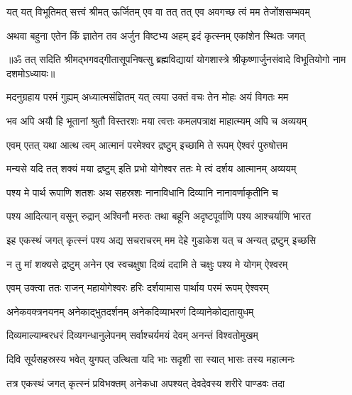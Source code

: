 \twolineshloka
{यत् यत् विभूतिमत् सत्त्वं श्रीमत् ऊर्जितम् एव वा}
{तत् तत् एव अवगच्छ त्वं मम तेजोंशसम्भवम्}%

\twolineshloka
{अथवा बहुना एतेन किं ज्ञातेन तव अर्जुन}
{विष्टभ्य अहम् इदं कृत्स्नम् एकांशेन स्थितः जगत्}%

{॥ॐ तत् सदिति श्रीमद्भगवद्गीतासूपनिषत्सु ब्रह्मविद्यायां योगशास्त्रे श्रीकृष्णार्जुनसंवादे विभूतियोगो नाम दशमोऽध्यायः॥}



\twolineshloka
{मदनुग्रहाय परमं गुह्यम् अध्यात्मसंज्ञितम्}
{यत् त्वया उक्तं वचः तेन मोहः अयं विगतः मम}%

\twolineshloka
{भव अपि अयौ हि भूतानां श्रुतौ विस्तरशः मया}
{त्वत्तः कमलपत्राक्ष माहात्म्यम् अपि च अव्ययम्}%

\twolineshloka
{एवम् एतत् यथा आत्थ त्वम् आत्मानं परमेश्वर}
{द्रष्टुम् इच्छामि ते रूपम् ऐश्वरं पुरुषोत्तम}%

\twolineshloka
{मन्यसे यदि तत् शक्यं मया द्रष्टुम् इति प्रभो}
{योगेश्वर ततः मे त्वं दर्शय आत्मानम् अव्ययम्}%


\twolineshloka
{पश्य मे पार्थ रूपाणि शतशः अथ सहस्रशः}
{नानाविधानि दिव्यानि नानावर्णाकृतीनि च}%

\twolineshloka
{पश्य आदित्यान् वसून् रुद्रान् अश्विनौ मरुतः तथा}
{बहूनि अदृष्टपूर्वाणि पश्य आश्चर्याणि भारत}%

\twolineshloka
{इह एकस्थं जगत् कृत्स्नं पश्य अद्य सचराचरम्}
{मम देहे गुडाकेश यत् च अन्यत् द्रष्टुम् इच्छसि}%

\twolineshloka
{न तु मां शक्यसे द्रष्टुम् अनेन एव स्वचक्षुषा}
{दिव्यं ददामि ते चक्षुः पश्य मे योगम् ऐश्वरम्}%


\twolineshloka
{एवम् उक्त्वा ततः राजन् महायोगेश्वरः हरिः}
{दर्शयामास पार्थाय परमं रूपम् ऐश्वरम्}%

\twolineshloka
{अनेकवक्त्रनयनम् अनेकाद्भुतदर्शनम्}
{अनेकदिव्याभरणं दिव्यानेकोद्यतायुधम्}%

\twolineshloka
{दिव्यमाल्याम्बरधरं दिव्यगन्धानुलेपनम्}
{सर्वाश्चर्यमयं देवम् अनन्तं विश्वतोमुखम्}%

\twolineshloka
{दिवि सूर्यसहस्रस्य भवेत् युगपत् उत्थिता}
{यदि भाः सदृशी सा स्यात् भासः तस्य महात्मनः}%

\twolineshloka
{तत्र एकस्थं जगत् कृत्स्नं प्रविभक्तम् अनेकधा}
{अपश्यत् देवदेवस्य शरीरे पाण्डवः तदा}%

